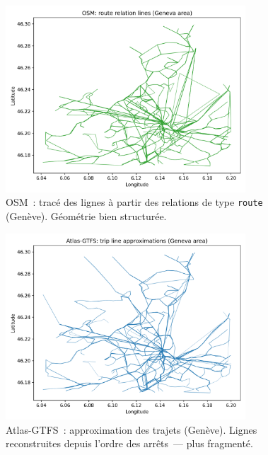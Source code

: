 \begin{figure}[H]
  \centering
  \includegraphics[width=0.8\textwidth]{../figures/chap4/geneva_osm_route_lines.png}
  \caption[OSM : tracé des lignes (Genève)]{OSM : tracé des lignes à partir des relations de type \texttt{route} (Genève). Géométrie bien structurée.}
\end{figure}

\begin{figure}[H]
  \centering
  \includegraphics[width=0.8\textwidth]{../figures/chap4/geneva_atlas_gtfs_trip_lines.png}
  \caption[Atlas-GTFS : approximation des trajets (Genève)]{Atlas-GTFS : approximation des trajets (Genève). Lignes reconstruites depuis l'ordre des arrêts — plus fragmenté.}
\end{figure}

